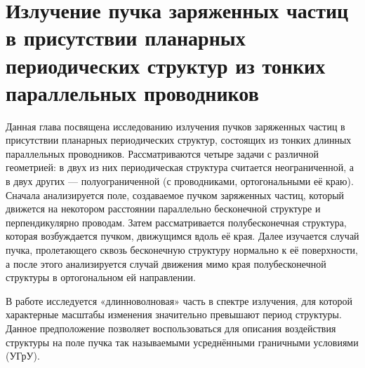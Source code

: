 \chapter{Излучение пучка заряженных частиц в присутствии планарных периодических структур из тонких параллельных проводников} \label{ch:1}

Данная глава посвящена исследованию излучения пучков заряженных частиц в присутствии планарных периодических структур, состоящих из тонких длинных параллельных проводников. Рассматриваются четыре задачи с различной геометрией: в двух из них периодическая структура считается неограниченной, а в двух других — полуограниченной (с проводниками, ортогональными её краю). Сначала анализируется поле, создаваемое пучком заряженных частиц, который движется на некотором расстоянии параллельно бесконечной структуре и перпендикулярно проводам. Затем рассматривается полубесконечная структура, которая возбуждается пучком, движущимся вдоль её края. Далее изучается случай пучка, пролетающего сквозь бесконечную структуру нормально к её поверхности, а после этого анализируется случай движения мимо края полубесконечной структуры в ортогональном ей направлении.

В работе исследуется «длинноволновая» часть в спектре излучения, для которой характерные масштабы изменения значительно превышают период структуры. Данное предположение позволяет воспользоваться для описания воздействия структуры на поле пучка так называемыми усреднёнными граничными условиями (УГрУ).


